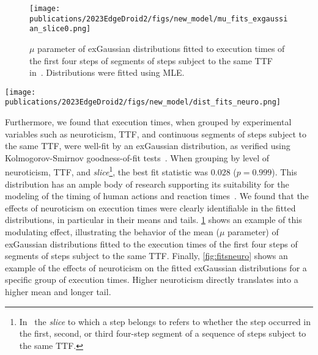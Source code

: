 \begin{figure}
    \centering
    \texttt{[image: publications/2023EdgeDroid2/figs/new\_model/mu\_fits\_exgaussian\_slice0.png]}
    \caption{%
        \( \mu \) parameter of \gls{exGaussian} distributions fitted to execution times of the first four steps of segments of steps subject to the same \gls{TTF} in~\cite{olguinmunoz:impact2021}.
        Distributions were fitted using \gls{MLE}.
    }\label{fig:muexgaussian}
\end{figure}

\begin{figure*}
    \centering
    \texttt{[image: publications/2023EdgeDroid2/figs/new\_model/dist\_fits\_neuro.png]}
    \caption{%
        Example \gls{exGaussian} fits on execution times from steps \numrange{4}{8} in a segment of steps at the maximum experimental \gls{TTF}.
        The effects of neuroticism are clearly visible in the tail and the mean of the distributions.
    }\label{fig:fitsneuro}
\end{figure*}

Furthermore, we found that execution times, when grouped by experimental variables such as neuroticism, \gls{TTF}, and continuous segments of steps subject to the same \gls{TTF}, were well-fit by an \gls{exGaussian} distribution, as verified using Kolmogorov-Smirnov goodness-of-fit tests~\cite{massey1951kolmogorov}.
When grouping by level of neuroticism, \gls{TTF}, and \emph{slice}\footnote{%
In~\cite{olguinmunoz:impact2021} the \emph{slice} to which a step belongs to refers to whether the step occurred in the first, second, or third four-step segment of a sequence of steps subject to the same \gls{TTF}.
}, the best fit statistic was \ensuremath{0.028} (\ensuremath{p = 0.999}).
This distribution has an ample body of research supporting its suitability for the modeling of the timing of human actions and reaction times~\cite{Rohrer1994analysis,Palmer2011shapes,Marmolejo2022generalised}.
We found that the effects of neuroticism on execution times were clearly identifiable in the fitted distributions, in particular in their means and tails.
\cref{fig:muexgaussian} shows an example of this modulating effect, illustrating the behavior of the mean (\( \mu \) parameter) of \gls{exGaussian} distributions fitted to the execution times of the first four steps of segments of steps subject to the same \gls{TTF}.
Finally, \cref{fig:fitsneuro} shows an example of the effects of neuroticism on the fitted \gls{exGaussian} distributions for a specific group of execution times.
Higher neuroticism directly translates into a higher mean and longer tail.
